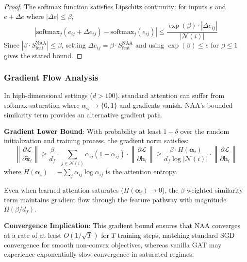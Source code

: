 \begin{proof}
The softmax function satisfies Lipschitz continuity: for inputs $e$ and $e + \Delta e$ where $|\Delta e| \leq \beta$,
\begin{equation}
\left| \text{softmax}_j(e_{ij} + \Delta e_{ij}) - \text{softmax}_j(e_{ij}) \right| \leq \frac{\exp(\beta) \cdot |\Delta e_{ij}|}{|\mathcal{N}(i)|}
\end{equation}
Since $|\beta \cdot S_{\text{feat}}^{\text{NAA}}| \leq \beta$, setting $\Delta e_{ij} = \beta \cdot S_{\text{feat}}^{\text{NAA}}$ and using $\exp(\beta) \leq e$ for $\beta \leq 1$ gives the stated bound.
\end{proof}

\subsubsection{Gradient Flow Analysis}

\begin{theorem}
\label{thm:gradients}
In high-dimensional settings ($d > 100$), standard attention can suffer from softmax saturation where $\alpha_{ij} \to \{0, 1\}$ and gradients vanish. NAA's bounded similarity term provides an alternative gradient path.

\textbf{Gradient Lower Bound}: With probability at least $1 - \delta$ over the random initialization and training process, the gradient norm satisfies:
\begin{equation}
\left\| \frac{\partial \mathcal{L}}{\partial \tilde{\mathbf{x}}_i} \right\| \geq \frac{\beta}{d_f} \cdot \sum_{j \in \mathcal{N}(i)} \alpha_{ij}(1-\alpha_{ij}) \cdot \left\| \frac{\partial \mathcal{L}}{\partial \mathbf{h}_i} \right\| \geq \frac{\beta \cdot H(\boldsymbol{\alpha}_i)}{d_f \log|\mathcal{N}(i)|} \cdot \left\| \frac{\partial \mathcal{L}}{\partial \mathbf{h}_i} \right\|
\end{equation}
where $H(\boldsymbol{\alpha}_i) = -\sum_j \alpha_{ij} \log \alpha_{ij}$ is the attention entropy.

Even when learned attention saturates ($H(\boldsymbol{\alpha}_i) \to 0$), the $\beta$-weighted similarity term maintains gradient flow through the feature pathway with magnitude $\Omega(\beta/d_f)$.

\textbf{Convergence Implication}: This gradient bound ensures that NAA converges at a rate of at least $O(1/\sqrt{T})$ for $T$ training steps, matching standard SGD convergence for smooth non-convex objectives, whereas vanilla GAT may experience exponentially slow convergence in saturated regimes.
\end{theorem}

